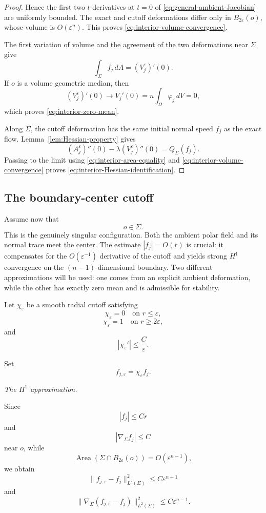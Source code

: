 \documentclass[11pt,reqno]{amsart}
\numberwithin{equation}{section}
\theoremstyle{definition}
\theoremstyle{remark}
\newcommand{\Area}{\operatorname{Area}}
\newcommand{\eps}{\varepsilon}
\newcommand{\ithead}[1]{%
  \par\medskip\noindent\textit{#1}\enspace
}
\begin{document}
\begin{proof}
Hence the first two \(t\)-derivatives at \(t=0\) of
\eqref{eq:general-ambient-Jacobian} are uniformly bounded. The exact and
cutoff deformations differ only in \(B_{2\eps}(o)\), whose volume is
\(O(\eps^n)\). This proves
\eqref{eq:interior-volume-convergence}.

The first variation of volume and the agreement of the two deformations
near \(\Sigma\) give
\[
\int_\Sigma f_j\,dA=(V^\eps_j)'(0).
\]
If \(o\) is a volume geometric median, then
\[
(V^\eps_j)'(0)
\longrightarrow
V_j'(0)
=n\int_\Omega\varphi_j\,dV
=0,
\]
which proves \eqref{eq:interior-zero-mean}.

Along \(\Sigma\), the cutoff deformation has the same initial normal speed \(f_j\)
as the exact flow. Lemma~\ref{lem:Hessian-property} gives
\[
(A^\eps_j)''(0)-\lambda(V^\eps_j)''(0)
=
Q_\Sigma(f_j).
\]
Passing to the limit using
\eqref{eq:interior-area-equality} and
\eqref{eq:interior-volume-convergence} proves
\eqref{eq:interior-Hessian-identification}.
\end{proof}

\subsection{The boundary-center cutoff}\label{sec:boundary-cutoff}

Assume now that
\[
o\in\Sigma.
\]
This is the genuinely singular configuration.  Both the ambient polar field
and its normal trace meet the center.  The estimate $|f_j|=O(r)$ is crucial:
it compensates for the $O(\eps^{-1})$ derivative of the cutoff and yields
strong $H^1$ convergence on the $(n-1)$-dimensional boundary.  Two different
approximations will be used: one comes from an explicit ambient deformation, while
the other has exactly zero mean and is admissible for stability.

Let \(\chi_\eps\) be a smooth radial cutoff satisfying
\[
\chi_\eps=0
\quad\text{on }r\le\eps,
\]
\[
\chi_\eps=1
\quad\text{on }r\ge2\eps,
\]
and
\[
|\chi_\eps'|\le\frac{C}{\eps}.
\]

Set
\[
f_{j,\eps}
=
\chi_\eps f_j.
\]

\ithead{The \texorpdfstring{\(H^1\)}{H1} approximation.}

Since
\[
|f_j|\le Cr
\]
and
\[
|\nabla_\Sigma f_j|\le C
\]
near \(o\), while
\[
\Area(\Sigma\cap B_{2\eps}(o))
=
O(\eps^{n-1}),
\]
we obtain
\[
\|f_{j,\eps}-f_j\|_{L^2(\Sigma)}^2
\le
C\eps^{n+1}
\]
and
\[
\|
\nabla_\Sigma(f_{j,\eps}-f_j)
\|_{L^2(\Sigma)}^2
\le
C\eps^{n-1}.
\]
\end{document}
